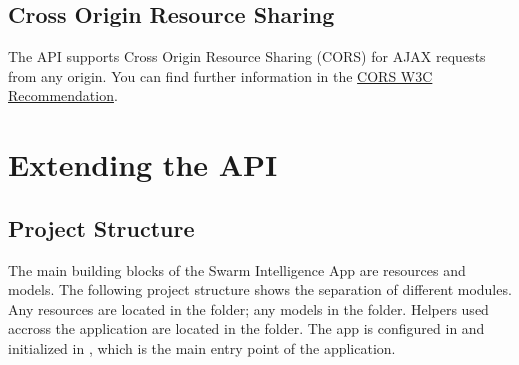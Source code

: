 \documentclass[letterpaper,10pt,english]{sphinxmanual}
\begin{document}

\begin{sphinxVerbatim}[commandchars=\\\{\}]
  
 

\PYG{p}{[}
         
         
         
         
\PYG{p}{]}
\end{sphinxVerbatim}


\section{Cross Origin Resource Sharing}
\label{\detokenize{usage:cross-origin-resource-sharing}}
The API supports Cross Origin Resource Sharing (CORS) for AJAX requests from any origin. You can find further information in the \href{https://www.w3.org/TR/cors/}{CORS W3C Recommendation}.


\chapter{Extending the API}
\label{\detokenize{developers:extending-the-api}}\label{\detokenize{developers::doc}}

\section{Project Structure}
\label{\detokenize{developers:project-structure}}
The main building blocks of the Swarm Intelligence App are resources and models. The following project structure shows the separation of different modules. Any resources are located in the  folder; any models in the  folder. Helpers used accross the application are located in the  folder. The app is configured in  and initialized in , which is the main entry point of the application.
\end{document}
